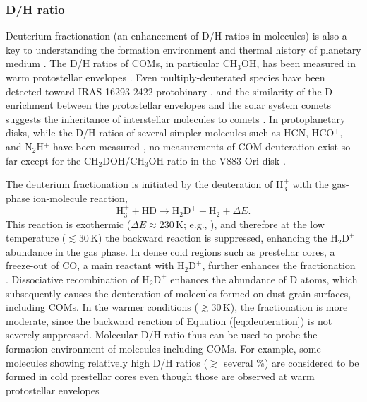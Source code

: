 \documentclass[linenumbers, twocolumn, twocolappendix, astrosymb, times]{aastex631}
\newcommand{\methanol}{CH$_3$OH\xspace}
\begin{document}
\subsubsection{D/H ratio}
Deuterium fractionation (an enhancement of D/H ratios in molecules) is also a key to understanding the formation environment and thermal history of planetary medium \citep[e.g.,][]{Ceccarelli2014, Nomura2023_PPVII}. The D/H ratios of COMs, in particular \methanol, has been measured in warm protostellar envelopes \citep[e.g.,][]{Jorgensen2018, Drozdovskaya2021}. Even multiply-deuterated species have been detected toward IRAS 16293-2422 protobinary \citep[e.g.,][]{Manigand2019, Richard2021, Drozdovskaya2022}, and the similarity of the D enrichment between the protostellar envelopes and the solar system comets suggests the inheritance of interstellar molecules to comets \citep{Drozdovskaya2021}. In protoplanetary disks, while the D/H ratios of several simpler molecules such as HCN, HCO$^{+}$, and N$_2$H$^{+}$ have been measured \citep[e.g.,][see also \citealt{Aikawa2022}]{Cataldi2021}, no measurements of COM deuteration exist so far except for the CH$_2$DOH/\methanol ratio in the V883 Ori disk \citep{Lee2019}. 


The deuterium fractionation is initiated by the deuteration of $\mathrm{H_3^+}$ with the gas-phase ion-molecule reaction, 
\begin{equation}\label{eq:deuteration}
    \mathrm{H}_3^+ + \mathrm{HD} \rightarrow \mathrm{H_2D^+} + \mathrm{H_2} + \Delta E.
\end{equation}
This reaction is exothermic ($\Delta E \approx 230$\,K; e.g., \citealt{Millar1989}), and therefore at the low temperature ($\lesssim 30$\,K) the backward reaction is suppressed, enhancing the $\mathrm{H_2D^+}$ abundance in the gas phase. In dense cold regions such as prestellar cores, a freeze-out of CO, a main reactant with $\mathrm{H_2D^+}$, further enhances the fractionation \citep[e.g.,][]{Roberts2000}. Dissociative recombination of $\mathrm{H_2D^+}$ enhances the abundance of D atoms, which subsequently causes the deuteration of molecules formed on dust grain surfaces, including COMs. In the warmer conditions ($\gtrsim 30$\,K), the fractionation is more moderate, since the backward reaction of Equation (\ref{eq:deuteration}) is not severely suppressed. Molecular D/H ratio thus can be used to probe the formation environment of molecules including COMs. For example, some molecules showing relatively high D/H ratios ($\gtrsim$ several \%) are considered to be formed in cold prestellar cores even though those are observed at warm protostellar envelopes \citep[e.g.,][]{Jorgensen2018, Yamato2022}
\end{document}
